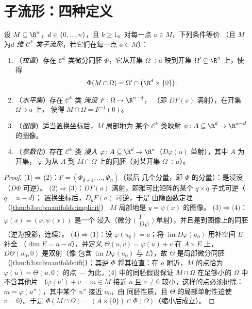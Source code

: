 \section{子流形：四种定义}

\begin{theorem}[等价刻画]
\label{thm:b3:submanifolds:characterizations}
设 $M \subseteq \R^n$，$d \in \{0, \dots, n\}$，且 $k \geq
1$。对每一点 $a \in M$，下列条件等价
（且 $M$ 为\emph{$d$ 维
$\mathcal C^k$ 类子流形}，若它们在每一点 $a
\in M$）：
\begin{enumerate}
  \item （\emph{拉直}）存在 $\mathcal C^k$ 类微分同胚
        $\Phi$，它从开集 $\Omega \ni a$
        映到开集 $\Omega' \subseteq \R^n$ 上，使得
        \[
        \Phi(M\cap\Omega) = \Omega' \cap
        \bigl(\R^d\times\{0\}\bigr).
        \]
  \item （\emph{水平集}）存在 $\mathcal C^k$ 类
        \emph{淹没} $F \colon \Omega \to \R^{n-d}$，
        （即 $DF(x)$ 满射），在开集 $\Omega \ni a$ 上，
        使得 $M\cap\Omega = F^{-1}(0)$。
  \item （\emph{图像}）适当置换坐标后，$M$ 局部地为
        某个 $\mathcal C^k$ 类映射 $\psi
        \colon A \subseteq \R^d \to \R^{n-d}$ 的图像。
  \item （\emph{参数化}）存在 $\mathcal C^k$ 类
        \emph{浸入} $\varphi \colon A \subseteq \R^d \to
        \R^n$（$D\varphi(u)$ 单射），其中 $A$ 为开集，
        $\varphi$ 为从 $A$ 到 $M \cap
        \Omega$ 上的同胚（对某开集 $\Omega \ni a$）。
\end{enumerate}
\end{theorem}

\begin{proof}
(1)$\Rightarrow$(2)：$F = (\Phi_{d+1}, \dots, \Phi_n)$（最后
几个分量，即 $\Phi$ 的分量）：是浸没（$D\Phi$ 可逆）。
(2)$\Rightarrow$(3)：$DF(a)$ 满射，即雅可比矩阵的某个 $q \times q$
子式可逆（$q = n - d$）；
置换坐标后，$D_yF(a)$ 可逆，于是
由隐函数定理（\cref{thm:b3:submanifolds:implicit}）
$M$ 局部地是 $y = \psi(x)$ 的图像。
(3)$\Rightarrow$(4)：$\varphi(x) = (x, \psi(x))$ 是一个
浸入（微分 $\bigl(\begin{smallmatrix}I\\
D\psi\end{smallmatrix}\bigr)$ 单射），并且是到图像上的同胚
（逆为投影，连续）。
(4)$\Rightarrow$(1)：设 $\varphi(u_0) = a$；将
$\operatorname{im}D\varphi(u_0)$ 用补空间 $E$ 补全
（$\dim E = n - d$），并定义 $\Theta(u, v) = \varphi(u) + v$
在 $A\times E$ 上，$D\Theta(u_0, 0)$ 是双射（像
包含 $\operatorname{im}D\varphi(u_0)$ 与 $E$），故
$\Theta$ 是局部微分同胚
（\cref{thm:b3:submanifolds:ift}）；其逆 $\Phi$
将其拉直：在 $a$ 附近，$M$ 的点恰为
$\varphi(u) = \Theta(u, 0)$ 的点 --- 为此，(4) 中的同胚假设保证
$M\cap\Omega$ 在足够小的 $\Omega$ 中不含其他片
（$\varphi(u') + v = m \in
M$ 接近 $a$ 且 $v \neq 0$ 较小，这样的点必须排除：
$m = \varphi(u'')$，其中某个 $u''$ 接近 $u_0$，由
同胚性质，且 $\Theta$ 的局部单射性迫使
$v = 0$）。于是 $\Phi(M\cap\Omega) = (A\times\{0\})
\cap\Phi(\Omega)$（缩小后成立）。
\end{proof}


